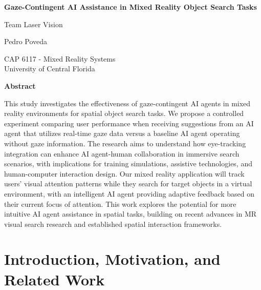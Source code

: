\documentclass[12pt,letterpaper]{article}
\begin{document}
\begin{titlepage}
\centering
\vspace*{2cm}

{\Huge\bfseries Gaze-Contingent AI Assistance in Mixed Reality Object Search Tasks}

\vspace{2cm}

{\Large Team Laser Vision}

\vspace{1cm}

{\large Pedro Poveda}

\vspace{1cm}

{\normalsize CAP 6117 - Mixed Reality Systems\\
University of Central Florida}

\vspace{3cm}

{\Large\bfseries Abstract}

\vspace{1cm}

\begin{minipage}{0.8\textwidth}
\justifying
This study investigates the effectiveness of gaze-contingent AI agents in mixed reality environments for spatial object search tasks. We propose a controlled experiment comparing user performance when receiving suggestions from an AI agent that utilizes real-time gaze data versus a baseline AI agent operating without gaze information. The research aims to understand how eye-tracking integration can enhance AI agent-human collaboration in immersive search scenarios, with implications for training simulations, assistive technologies, and human-computer interaction design. Our mixed reality application will track users' visual attention patterns while they search for target objects in a virtual environment, with an intelligent AI agent providing adaptive feedback based on their current focus of attention. This work explores the potential for more intuitive AI agent assistance in spatial tasks, building on recent advances in MR visual search research and established spatial interaction frameworks.
\end{minipage}

\vfill
\end{titlepage}

\newpage
\setcounter{page}{1}

\section{Introduction, Motivation, and Related Work}
\end{document}
